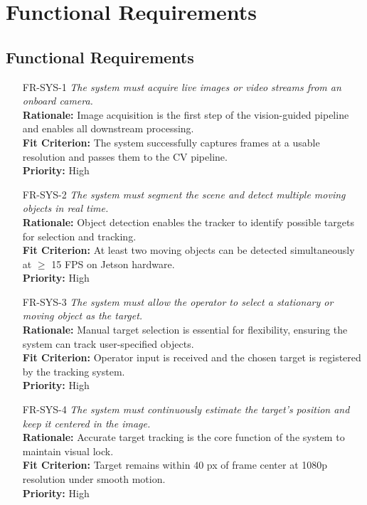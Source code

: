 \documentclass[12pt]{article}
\begin{document}
\section{Functional Requirements}
\subsection{Functional Requirements}

\begin{itemize}

  \item[FR-SYS-1] \emph{The system must acquire live images or video streams from an
          onboard camera.}\\[2mm]
        {\bf Rationale:} Image acquisition is the first step of the vision-guided pipeline and enables all downstream processing.\\
        {\bf Fit Criterion:} The system successfully captures frames at a usable resolution and passes them to the CV pipeline.\\
        {\bf Priority:} High

  \item[FR-SYS-2] \emph{The system must segment the scene and detect multiple moving
          objects in real time.}\\[2mm]
        {\bf Rationale:} Object detection enables the tracker to identify possible targets for selection and tracking.\\
        {\bf Fit Criterion:} At least two moving objects can be detected simultaneously at $\geq$ 15 FPS on Jetson hardware.\\
        {\bf Priority:} High

  \item[FR-SYS-3] \emph{The system must allow the operator to select a stationary or
          moving object as the target.}\\[2mm]
        {\bf Rationale:} Manual target selection is essential for flexibility, ensuring the system can track user-specified objects.\\
        {\bf Fit Criterion:} Operator input is received and the chosen target is registered by the tracking system.\\
        {\bf Priority:} High

  \item[FR-SYS-4] \emph{The system must continuously estimate the target’s position and
          keep it centered in the image.}\\[2mm]
        {\bf Rationale:} Accurate target tracking is the core function of the system to maintain visual lock.\\
        {\bf Fit Criterion:} Target remains within 40 px of frame center at 1080p resolution under smooth motion.\\
        {\bf Priority:} High


\end{itemize}
\end{document}
